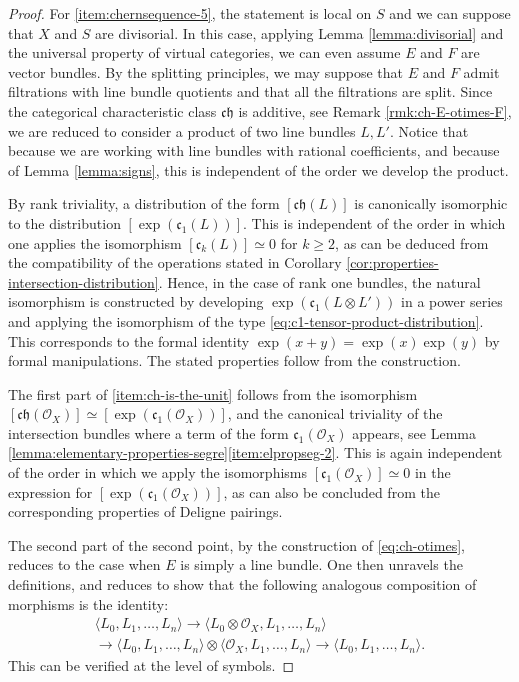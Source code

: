 \documentclass[JEP,XML,SOM,Unicode,published]{cedram}
\theoremstyle{plain}
\theoremstyle{definition}
\newcommand{\Ocal}{\mathcal O}
\newcommand{\cfrak}{\mathfrak c}
\newcommand{\chfrak}{\mathfrak {ch}}
\begin{document}
\begin{proof}
For \eqref{item:chernsequence-5}, the statement is local on $S$ and we can suppose that $X$ and $S$ are divisorial. In this case, applying Lemma \ref{lemma:divisorial} and the universal property of virtual categories, we can even assume $E$ and $F$ are vector bundles. By the splitting principles, we may suppose that $E$ and $F$ admit filtrations with line bundle quotients and that all the filtrations are split. Since the categorical characteristic class $\chfrak$ is additive, see Remark \ref{rmk:ch-E-otimes-F}, we are reduced to consider a product of two line bundles $L,L'$. Notice that because we are working with line bundles with rational coefficients, and because of Lemma \ref{lemma:signs}, this is independent of the order we develop the product.

By rank triviality, a distribution of the form $[\chfrak(L)]$ is canonically isomorphic to the distribution $[\exp(\cfrak_1(L))]$. This is independent of the order in which one applies the isomorphism $[\cfrak_k(L)]\simeq 0$ for $k \geq 2$, as can be deduced from the compatibility of the operations stated in Corollary \ref{cor:properties-intersection-distribution}. Hence, in the case of rank one bundles, the natural isomorphism is constructed by developing $\exp(\cfrak_1(L \otimes L'))$ in a power series and applying the isomorphism of the type \eqref{eq:c1-tensor-product-distribution}. This corresponds to the formal identity $\exp(x+y) = \exp(x) \exp(y)$ by formal manipulations. The stated properties follow from the construction.

The first part of \eqref{item:ch-is-the-unit} follows from the isomorphism $[\chfrak(\Ocal_X)]\simeq [\exp(\cfrak_{1}(\Ocal_{X}))]$, and the canonical triviality of the intersection bundles where a term of the form $\cfrak_1(\Ocal_X)$ appears, see Lemma \ref{lemma:elementary-properties-segre}\eqref{item:elpropseg-2}. This is again independent of the order in which we apply the isomorphisms $[\cfrak_1(\Ocal_X)]\simeq 0$ in the expression for $[\exp(\cfrak_{1}(\Ocal_{X}))]$, as can also be concluded from the corresponding properties of Deligne pairings.

The second part of the second point, by the construction of \eqref{eq:ch-otimes}, reduces to the case when $E$ is simply a line bundle. One then unravels the definitions, and reduces to show that the following analogous composition of morphisms is the identity:
\begin{multline*}
\langle L_{0}, L_1, \ldots, L_n \rangle \to \langle L_{0} \otimes \Ocal_X, L_1, \ldots, L_n \rangle\\
\to \langle L_{0}, L_1, \ldots, L_n \rangle \otimes \langle \Ocal_X, L_1, \ldots, L_n \rangle \to \langle L_{0}, L_1, \ldots, L_n\rangle.
\end{multline*}
This can be verified at the level of symbols.
\end{proof}
\end{document}

